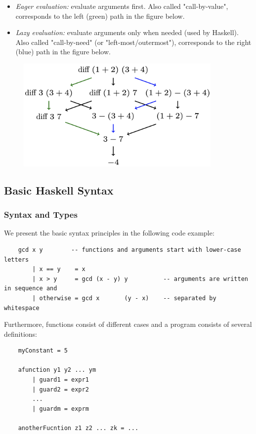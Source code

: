 \documentclass[a4paper]{extarticle}
\begin{document}
\begin{itemize}
    \item \textit{Eager evaluation:} evaluate arguments first. Also called "call-by-value", corresponds to the left (green) path in the figure below.
    \item \textit{Lazy evaluation:} evaluate arguments only when needed (used by Haskell). Also called "call-by-need" (or "left-most/outermost"), corresponds to the right (blue) path in the figure below.
\end{itemize}

\begin{figure}[H]
    \includegraphics[width=10cm]{../images/FMFP_Fig1-1}
    \centering
\end{figure}

\subsection{Basic Haskell Syntax}

\subsubsection{Syntax and Types}

We present the basic syntax principles in the following code example:

\begin{verbatim}
    gcd x y        -- functions and arguments start with lower-case letters
        | x == y    = x
        | x > y     = gcd (x - y) y          -- arguments are written in sequence and
        | otherwise = gcd x       (y - x)    -- separated by whitespace
\end{verbatim}

Furthermore, functions consist of different cases and a program consists of several definitions:

\begin{verbatim}
    myConstant = 5

    afunction y1 y2 ... ym
        | guard1 = expr1
        | guard2 = expr2
        ...
        | guardm = exprm

    anotherFucntion z1 z2 ... zk = ...
\end{verbatim}
\end{document}

